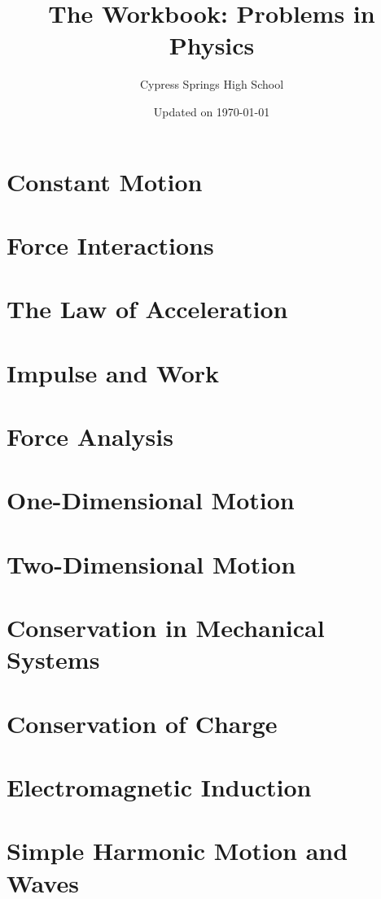 \documentclass[]{exam}
\title{The Workbook: Problems in Physics}
\author{Cypress Springs High School}
\date{Updated on \today}
\begin{document}
\maketitle

\section{Constant Motion}



\section{Force Interactions}



\section{The Law of Acceleration}



\section{Impulse and Work}



\section{Force Analysis}



\section{One-Dimensional Motion}



\section{Two-Dimensional Motion}



\section{Conservation in Mechanical Systems}



\section{Conservation of Charge}



\section{Electromagnetic Induction}



\section{Simple Harmonic Motion and Waves}


\end{document}
